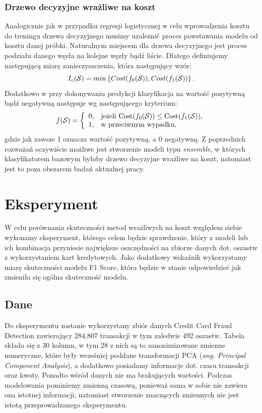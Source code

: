 \documentclass{book}
\begin{document}
\subsection{Drzewo decyzyjne wrażliwe na koszt}
	Analogicznie jak w przypadku regresji logistycznej w celu wprowadzenia kosztu do treningu drzewa decyzyjnego musimy uzależnić proces powstawania modelu od kosztu danej próbki. Naturalnym miejscem dla drzewa decyzyjnego jest proces podziału danego węzła na kolejne węzły bądź liście. Dlatego definiujemy następującą miarę zanieczyszczenia, która następujący wzór:
	$$ I_c(\mathcal{S}) = min \left\{ Cost(f_0(\mathcal{S})), Cost(f_1(\mathcal{S})) \right\} \text{.}$$
	Dodatkowo w przy dokonywaniu predykcji klasyfikacja na wartość pozytywną bądź negatywną następuje wg następującego kryterium:
	$$ f(\mathcal{S}) =  \left\{
		\begin{array}{rl}
			0, &\mbox{jeżeli $\text{Cost}(f_0(\mathcal{S})) \leq \text{Cost}(f_1(\mathcal{S}))$}, \\
			1, &\mbox{w przeciwnym wypadku},
		\end{array}{}
	\right.
	$$
	gdzie jak zawsze 1 oznacza wartość pozytywną, a 0 negatywną. 
	Z poprzednich rozważań oczywiście możliwe jest stworzenie modeli typu \textit{ensemble}, w których klasyfikatorem bazowym byłoby drzewo decyzyjne wrażliwe na koszt, natomiast jest to poza obszarem badań aktualnej pracy.
\chapter{Eksperyment}
	W celu porównania skuteczności metod wrażliwych na koszt względem siebie wykonamy eksperyment, którego celem będzie sprawdzenie, który z modeli lub ich kombinacja przyniesie największe oszczędności na zbiorze danych dot. oszustw z wykorzystaniem kart kredytowych. Jako dodatkowy wskaźnik wykorzystamy miarę skuteczności modelu F1 Score, która będzie w stanie odpowiedzieć jak zmieniła się ogólna skuteczność modelu.

\section{Dane}
	Do eksperymentu zostanie wykorzystany zbiór danych Credit Card Fraud Detection zawierający 284,807 transakcji w tym zaledwie 492 oszustw. Tabela składa się z 30 kolumn, w tym 28 z nich są to zanonimizowane zmienne numeryczne, które były wcześniej poddane transformacji PCA (\textit{ang. Principal Component Analysis}), a dodatkowo posiadamy informacje dot. czasu transakcji oraz kwoty. Ponadto wśród danych nie ma brakujących wartości. Podczas modelowania pominiemy zmienną czasową, ponieważ sama w sobie nie zawiera ona istotnej informacji, natomiast stworzenie znaczących zmiennych nie jest istotą przeprowadzanego eksperymentu. 
	
\end{document}
